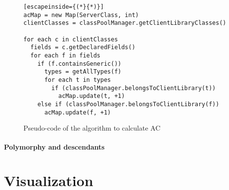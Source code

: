 \begin{figure}[ht!]
\begin{lstlisting}[escapeinside={(*}{*)}]
acMap = new Map(ServerClass, int)
clientClasses = classPoolManager.getClientLibraryClasses()

for each c in clientClasses
  fields = c.getDeclaredFields()
  for each f in fields
    if (f.containsGeneric())
      types = getAllTypes(f)
      for each t in types
        if (classPoolManager.belongsToClientLibrary(t))
          acMap.update(t, +1)
    else if (classPoolManager.belongsToClientLibrary(f))
      acMap.update(f, +1)
\end{lstlisting}
\caption{Pseudo-code of the algorithm to calculate AC}
\label{fig:algorithm-ac}
\end{figure}

\paragraph{Polymorphy and descendants}

\section{Visualization}
